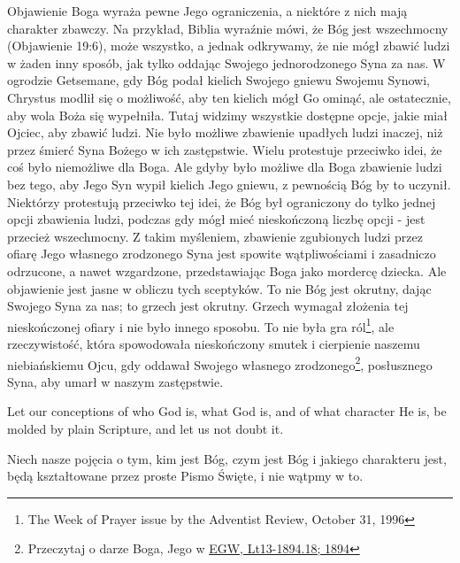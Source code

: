 Objawienie Boga wyraża pewne Jego ograniczenia, a niektóre z nich mają charakter zbawczy. Na przykład, Biblia wyraźnie mówi, że Bóg jest wszechmocny (Objawienie 19:6), może wszystko, a jednak odkrywamy, że nie mógł zbawić ludzi w żaden inny sposób, jak tylko oddając Swojego jednorodzonego Syna za nas. W ogrodzie Getsemane, gdy Bóg podał kielich Swojego gniewu Swojemu Synowi, Chrystus modlił się o możliwość, aby ten kielich mógł Go ominąć, ale ostatecznie, aby wola Boża się wypełniła. Tutaj widzimy wszystkie dostępne opcje, jakie miał Ojciec, aby zbawić ludzi. Nie było możliwe zbawienie upadłych ludzi inaczej, niż przez śmierć Syna Bożego w ich zastępstwie. Wielu protestuje przeciwko idei, że coś było niemożliwe dla Boga. Ale gdyby było możliwe dla Boga zbawienie ludzi bez tego, aby Jego Syn wypił kielich Jego gniewu, z pewnością Bóg by to uczynił. Niektórzy protestują przeciwko tej idei, że Bóg był ograniczony do tylko jednej opcji zbawienia ludzi, podczas gdy mógł mieć nieskończoną liczbę opcji - jest przecież wszechmocny. Z takim myśleniem, zbawienie zgubionych ludzi przez ofiarę Jego własnego zrodzonego Syna jest spowite wątpliwościami i zasadniczo odrzucone, a nawet wzgardzone, przedstawiając Boga jako mordercę dziecka. Ale objawienie jest jasne w obliczu tych sceptyków. To nie Bóg jest okrutny, dając Swojego Syna za nas; to grzech jest okrutny. Grzech wymagał złożenia tej nieskończonej ofiary i nie było innego sposobu. To nie była gra ról\footnote{The Week of Prayer issue by the Adventist Review, October 31, 1996}, ale rzeczywistość, która spowodowała nieskończony smutek i cierpienie naszemu niebiańskiemu Ojcu, gdy oddawał Swojego własnego zrodzonego\footnote{Przeczytaj o darze Boga, Jego  w \href{https://egwwritings.org/?ref=en_Lt13-1894.18&para=5486.24}{{EGW, Lt13-1894.18; 1894}}}, posłusznego Syna, aby umarł w naszym zastępstwie.


Let our conceptions of who God is, what God is, and of what character He is, be molded by plain Scripture, and let us not doubt it.


Niech nasze pojęcia o tym, kim jest Bóg, czym jest Bóg i jakiego charakteru jest, będą kształtowane przez proste Pismo Święte, i nie wątpmy w to.




% 
